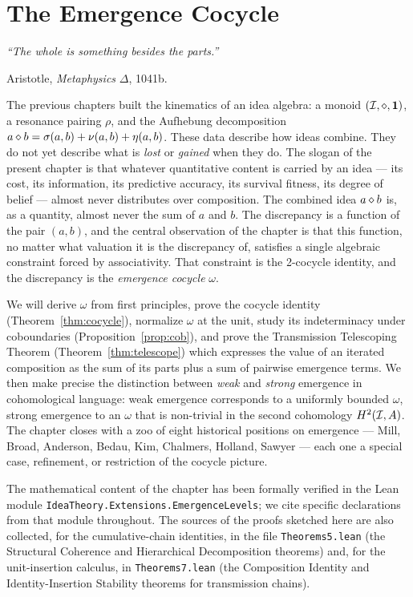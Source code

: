 \chapter{The Emergence Cocycle}\label{ch:emergence}

\epigraph{\itshape ``The whole is something besides the parts.''}{Aristotle, \emph{Metaphysics} $\Delta$, 1041b.}

The previous chapters built the kinematics of an idea algebra: a monoid
$(\mathcal{I},\mathbin{\diamond},\mathbf{1})$, a resonance pairing $\rho$, and the Aufhebung decomposition
$a\mathbin{\diamond} b = \sigma(a,b) + \nu(a,b) + \eta(a,b)$. These data describe how
ideas combine. They do not yet describe what is \emph{lost} or \emph{gained}
when they do. The slogan of the present chapter is that whatever quantitative
content is carried by an idea --- its cost, its information, its predictive
accuracy, its survival fitness, its degree of belief --- almost never
distributes over composition. The combined idea $a\mathbin{\diamond} b$ is, as a
quantity, almost never the sum of $a$ and $b$. The discrepancy is a function
of the pair $(a,b)$, and the central observation of the chapter is that this
function, no matter what valuation it is the discrepancy of, satisfies a
single algebraic constraint forced by associativity. That constraint is the
2-cocycle identity, and the discrepancy is the \emph{emergence cocycle}
$\omega$.

We will derive $\omega$ from first principles, prove the cocycle identity
(Theorem~\ref{thm:cocycle}), normalize $\omega$ at the unit, study its
indeterminacy under coboundaries (Proposition~\ref{prop:cob}), and prove the
Transmission Telescoping Theorem (Theorem~\ref{thm:telescope}) which
expresses the value of an iterated composition as the sum of its parts plus a
sum of pairwise emergence terms. We then make precise the distinction
between \emph{weak} and \emph{strong} emergence in cohomological language:
weak emergence corresponds to a uniformly bounded $\omega$, strong emergence
to an $\omega$ that is non-trivial in the second cohomology
$H^2(\mathcal{I}, A)$. The chapter closes with a zoo of eight historical
positions on emergence --- Mill, Broad, Anderson, Bedau, Kim, Chalmers,
Holland, Sawyer --- each one a special case, refinement, or restriction of
the cocycle picture.

The mathematical content of the chapter has been formally verified in the
Lean module \texttt{IdeaTheory.Extensions.EmergenceLevels}; we cite specific
declarations from that module throughout. The sources of the proofs sketched
here are also collected, for the cumulative-chain identities, in the file
\texttt{Theorems5.lean} (the Structural Coherence and Hierarchical
Decomposition theorems) and, for the unit-insertion calculus, in
\texttt{Theorems7.lean} (the Composition Identity and Identity-Insertion
Stability theorems for transmission chains).


